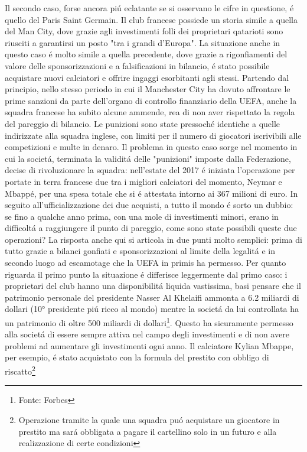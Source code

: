 \documentclass[
    corpo=12pt,
    oneside,
    evenboxes,
    tipotesi=triennale,
    stile=classica,
    oldstyle,
    autoretitolo,
    greek,
]{toptesi}
\begin{document}
\begin{interlinea}{1.5}
Il secondo caso, forse ancora pi\'u eclatante se si osservano le cifre in questione, \'e quello del Paris Saint Germain. Il club francese 
possiede un storia simile a quella del Man City, dove grazie agli investimenti folli dei proprietari qatarioti sono riusciti a garantirsi un posto 
"tra i grandi d'Europa". La situazione anche in questo caso \'e molto simile a quella precedente, dove grazie a rigonfiamenti del valore
delle sponsorizzazioni e a falsificazioni in bilancio, \'e stato possibile acquistare nuovi calciatori e offrire ingaggi esorbitanti agli stessi.
Partendo dal principio, nello stesso periodo in cui il Manchester City ha dovuto affrontare le prime sanzioni da parte dell'organo di controllo
finanziario della UEFA, anche la squadra francese ha subito alcune ammende, rea di non aver rispettato la regola del pareggio di bilancio. 
Le punizioni sono state pressoch\'e identiche a quelle indirizzate alla squadra inglese, con limiti per il numero di giocatori iscrivibili alle 
competizioni e multe in denaro. Il problema in questo caso sorge nel momento in cui la societ\'a, terminata la validit\'a delle "punizioni"
imposte dalla Federazione, decise di rivoluzionare la squadra: nell'estate del 2017 \'e iniziata l'operazione per portate in terra francese
due tra i migliori calciatori del momento, Neymar e Mbapp\'e, per una spesa totale che si \'e attestata intorno ai 367 
milioni di euro. In seguito all'ufficializzazione dei due acquisti, a tutto il mondo \'e sorto un dubbio: se fino a qualche anno prima,
con una mole di investimenti minori, erano in difficolt\'a a raggiungere il punto di pareggio, come sono state possibili queste due 
operazioni? La risposta anche qui si articola in due punti molto semplici: prima di tutto grazie a bilanci gonfiati e sponsorizzazioni al 
limite della legalit\'a e in secondo luogo ad escamotage che la UEFA in primis ha permesso. Per quanto riguarda il primo punto la situazione \'e
differisce leggermente dal primo caso: i proprietari del club hanno una disponibilit\'a liquida vastissima, basi pensare che il patrimonio
personale del presidente Nasser Al Khelaifi ammonta a 6.2 miliardi di dollari (10° presidente pi\'u ricco al mondo) mentre la societ\'a da lui 
controllata ha un patrimonio di oltre 500 miliardi di dollari\footnote{Fonte: Forbes}. Questo ha sicuramente permesso alla societ\'a
di essere sempre attiva nel campo degli investimenti e di non avere problemi ad aumentare gli investimenti ogni anno.
Il calciatore Kylian Mbappe, per esempio, \'e stato acquistato con la formula del prestito con obbligo di riscatto\footnote{Operazione tramite la quale una squadra pu\'o acquistare un giocatore in prestito ma sar\'a obbligata a pagare il cartellino solo in un futuro e alla realizzazione di certe condizioni} 

\end{interlinea}
\end{document}
